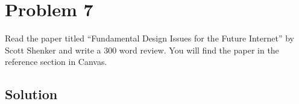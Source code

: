 
\section*{Problem 7}

Read the paper titled ``Fundamental Design Issues for the Future Internet'' by Scott Shenker and write a 300
word review.
You will find the paper in the reference section in Canvas.

\subsection*{Solution}
